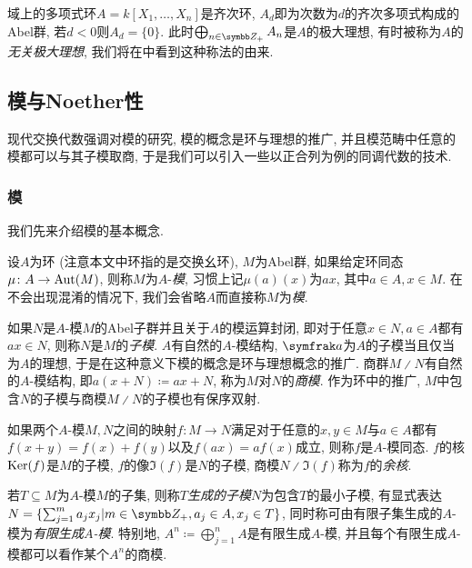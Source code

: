 \begin{example}
  域上的多项式环$A=k[X_1, \dotsc, X_n]$是齐次环, $A_d$即为次数为$d$的齐次多项式构成的Abel群, 若$d<0$则$A_d=\{0\}$. 此时$\bigoplus_{n\in\ZZ_+}A_n$是$A$的极大理想, 有时被称为$A$的\emph{无关极大理想}, 我们将在中看到这种称法的由来.
\end{example}


\subsection{模与Noether性}

现代交换代数强调对模的研究, 模的概念是环与理想的推广, 并且模范畴中任意的模都可以与其子模取商, 于是我们可以引入一些以正合列为例的同调代数的技术.

\subsubsection{模}

我们先来介绍模的基本概念.

\begin{definition}
  设$A$为环 (注意本文中环指的是交换幺环), $M$为Abel群, 如果给定环同态$\mu\colon A\to \operatorname{Aut}(M)$, 则称$M$为$A$-\emph{模}, 习惯上记$\mu(a)(x)$为$ax$, 其中$a\in A, x\in M$. 在不会出现混淆的情况下, 我们会省略$A$而直接称$M$为\emph{模}.
\end{definition}

如果$N$是$A$-模$M$的Abel子群并且关于$A$的模运算封闭, 即对于任意$x\in N, a\in A$都有$ax\in N$, 则称$N$是$M$的\emph{子模}. $A$有自然的$A$-模结构, $\ideal{a}$为$A$的子模当且仅当为$A$的理想, 于是在这种意义下模的概念是环与理想概念的推广. 商群$M{\divslash}N$有自然的$A$-模结构, 即$a(x+N)\coloneq ax+N$, 称为$M$对$N$的\emph{商模}. 作为环中的推广, $M$中包含$N$的子模与商模$M{\divslash}N$的子模也有保序双射.

如果两个$A$-模$M, N$之间的映射$f\colon M\to N$满足对于任意的$x, y\in M$与$a\in A$都有$f(x+y)=f(x)+f(y)$以及$f(ax)=af(x)$成立, 则称$f$是$A$-模同态. $f$的核$\operatorname{Ker} (f)$是$M$的子模, $f$的像$\Im (f)$是$N$的子模, 商模$N{\divslash}\Im (f)$称为$f$的\emph{余核}.

若$T\subseteq M$为$A$-模$M$的子集, 则称$T$\emph{生成的子模}$N$为包含$T$的最小子模, 有显式表达$N=\{\sum_{j=1}^m a_jx_j\vert m\in\ZZ_+, a_j\in A, x_j\in T\}$, 同时称可由有限子集生成的$A$-模为\emph{有限生成$A$-模}. 特别地, $A^n\coloneq \bigoplus_{j=1}^n A$是有限生成$A$-模, 并且每个有限生成$A$-模都可以看作某个$A^n$的商模.

